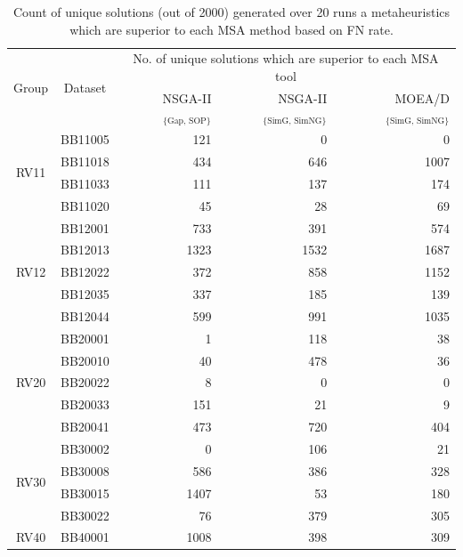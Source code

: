 \begin{table}[htbp]
	\scriptsize
	\centering
	\caption{Count of unique solutions (out of 2000) generated over 20 runs a metaheuristics which are superior to each MSA method based on FN rate.}
	\begin{tabular}{|c|l|r|r|r|}
		\hline
		\multicolumn{1}{|c|}{\multirow{2}{*}{Group}} & \multicolumn{1}{c|}{\multirow{2}{*}{Dataset}} & \multicolumn{3}{c|}{No. of unique solutions which are superior to each MSA tool} \\
		\cline{3-5}          &       & NSGA-II$_{\text{\{Gap, SOP\}}}$ & NSGA-II$_{\text{\{SimG, SimNG\}}}$ & MOEA/D$_{\text{\{SimG, SimNG\}}}$ \\
		\hline
		\multirow{4}{*}{RV11} & BB11005 & 121   & 0     & 0 \\
		\cline{2-5}          & BB11018 & 434   & 646   & 1007 \\
		\cline{2-5}          & BB11033 & 111   & 137   & 174 \\
		\cline{2-5}          & BB11020 & 45    & 28    & 69 \\
		\hline
		\multirow{5}{*}{RV12} & BB12001 & 733   & 391   & 574 \\
		\cline{2-5}          & BB12013 & 1323  & 1532  & 1687 \\
		\cline{2-5}          & BB12022 & 372   & 858   & 1152 \\
		\cline{2-5}          & BB12035 & 337   & 185   & 139 \\
		\cline{2-5}          & BB12044 & 599   & 991   & 1035 \\
		\hline
		\multirow{5}{*}{RV20} & BB20001 & 1     & 118   & 38 \\
		\cline{2-5}          & BB20010 & 40    & 478   & 36 \\
		\cline{2-5}          & BB20022 & 8     & 0     & 0 \\
		\cline{2-5}          & BB20033 & 151   & 21    & 9 \\
		\cline{2-5}          & BB20041 & 473   & 720   & 404 \\
		\hline
		\multirow{4}{*}{RV30} & BB30002 & 0     & 106   & 21 \\
		\cline{2-5}          & BB30008 & 586   & 386   & 328 \\
		\cline{2-5}          & BB30015 & 1407  & 53    & 180 \\
		\cline{2-5}          & BB30022 & 76    & 379   & 305 \\
		\hline
		\multirow{5}{*}{RV40} & BB40001 & 1008  & 398   & 309 \\

\end{tabular}
\end{table}
